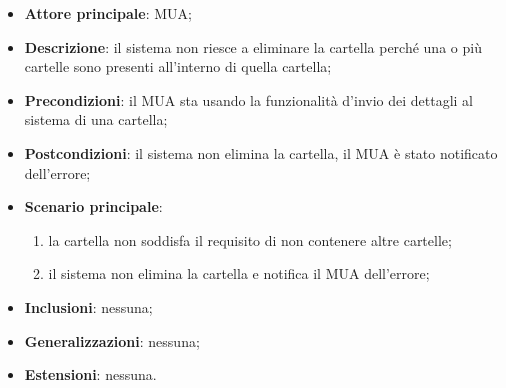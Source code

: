    \begin{itemize}
        \item \textbf{Attore principale}: MUA;
        \item \textbf{Descrizione}: il sistema non riesce a eliminare la cartella perché una o più cartelle sono presenti all'interno di quella cartella;
        \item \textbf{Precondizioni}: il MUA sta usando la funzionalità d'invio dei dettagli al sistema di una cartella;
        \item \textbf{Postcondizioni}: il sistema non elimina la cartella, il MUA è stato notificato dell'errore;
        \item \textbf{Scenario principale}:
            \begin{enumerate}
                \item la cartella non soddisfa il requisito di non contenere altre cartelle;
                \item il sistema non elimina la cartella e notifica il MUA dell'errore;
            \end{enumerate}
        \item \textbf{Inclusioni}: nessuna;
        \item \textbf{Generalizzazioni}: nessuna;
        \item \textbf{Estensioni}: nessuna.
    \end{itemize}

